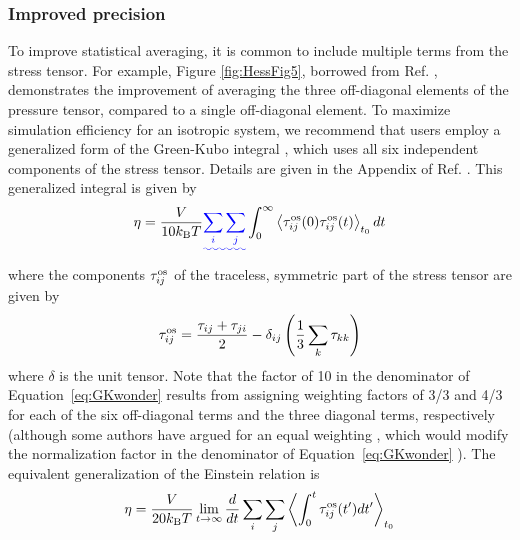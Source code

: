 \documentclass[9pt,bestpractices]{livecoms}
\providecommand{\DIFadd}[1]{{\protect\color{blue}\uwave{#1}}} %
\providecommand{\DIFaddbegin}{} %
\providecommand{\DIFaddend}{} %
\begin{document}
\subsubsection{Improved precision}	\label{sec:Viscosity:General: Improved precision}

To improve statistical averaging, it is common to include multiple terms from the stress tensor. For example, Figure \ref{fig:HessFig5}, borrowed from Ref. \cite{Hess2002}, demonstrates the improvement of averaging the three off-diagonal elements of the pressure tensor, compared to a single off-diagonal element. To maximize simulation efficiency for an isotropic system, we recommend that users employ a generalized form of the Green-Kubo integral \citep{Evans:90, Daivis:1994}, which uses all six independent components of the stress tensor. Details are given in the Appendix of Ref. \cite{Daivis:1994}. This generalized integral is given by
\begin{equation}
  \eta = \frac{V}{10 k_{\rm B} T} \DIFaddbegin \DIFadd{\sum_i \sum_j }\DIFaddend \int_0^\infty \left\langle \tau_{ij}^{\rm os}(0)\tau_{ij}^{\rm os}(t) \right\rangle_{t_0} dt
  \label{eq:GKwonder}
\end{equation}
where the components $\tau_{ij}^{\rm os}$ of the traceless, symmetric part of the stress tensor are given by
\begin{equation}
  \tau_{ij}^{\rm os} = \frac{\tau_{ij}+\tau_{ji}}{2} - \delta_{ij} \left( \frac{1}{3} \sum_k \tau_{kk} \right)
  \label{eq:Pwonder}
\end{equation}
where $\delta$ is the unit tensor. Note that the factor of 10 in the denominator of Equation~\ref{eq:GKwonder} results from assigning weighting factors of 3/3 and 4/3 for each of the six off-diagonal terms and the three diagonal terms, respectively \cite{Liu2012,Borodin2009,Mondello1997} (although some authors have argued for an equal weighting \cite{Chen2009}, which would modify the normalization factor in the denominator of Equation~\ref{eq:GKwonder} \DIFaddbegin \DIFadd{from 10 to 9}\DIFaddend ).
The equivalent generalization of the Einstein relation is
\begin{equation}
  \eta = \frac{V}{20 k_{\rm B} T} \lim_{t\to\infty} \frac{d}{dt} \sum_i \sum_j \left\langle \int_0^t \tau_{ij}^{\rm os}(t') dt' \right\rangle_{t_0}
  \label{eq:Einwonder}
\end{equation}
\end{document}
